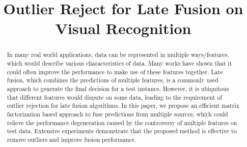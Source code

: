 \documentclass[letterpaper]{article}
\begin{document}
%



\title{Outlier Reject for Late Fusion on Visual Recognition}




\maketitle



\begin{abstract}
In many real world applications, data can be represented in multiple ways/features, which would describe various characteristics of data.
Many works have shown that it could often improve the performance to make use of these features together.
Late fusion, which combines the predictions of multiple features, is a commonly used approach to generate the final decision for a test instance.
However, it is ubiquitous that different features would dispute on some data, leading to the requirement of outlier rejection for late fusion algorithms.
In this paper, we propose an efficient matrix factorization based approach to fuse predictions from multiple sources, which could
relieve the performance degeneration caused by the controversy of multiple features on test data.
Extensive experiments demonstrate that the proposed method is effective to remove outliers and improve fusion performance.
\end{abstract}
\end{document}
